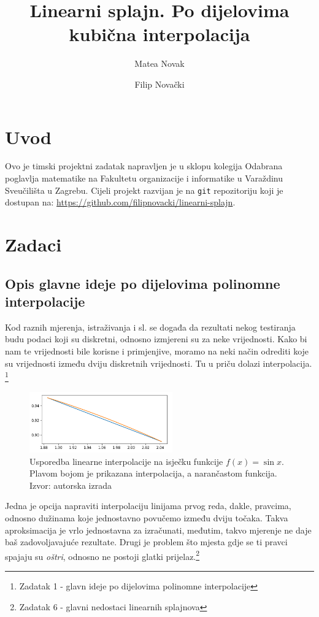 \documentclass[12pt,a4paper]{report}
\author{Matea Novak \and Filip Novački}
\title{Linearni splajn. Po dijelovima kubična interpolacija}
\begin{document}
	\maketitle
	
	\tableofcontents
	
\chapter{Uvod}
	Ovo je timski projektni zadatak napravljen je u sklopu kolegija Odabrana poglavlja matematike na Fakultetu organizacije i informatike u Varaždinu Sveučilišta u Zagrebu. Cijeli projekt razvijan je na \texttt{git} repozitoriju koji je dostupan na: \url{https://github.com/filipnovacki/linearni-splajn}. 
\chapter{Zadaci}
	\section{Opis glavne ideje po dijelovima polinomne interpolacije}
	Kod raznih mjerenja, istraživanja i sl. se događa da rezultati nekog testiranja budu podaci koji su diskretni, odnosno izmjereni su za neke vrijednosti. Kako bi nam te vrijednosti bile korisne i primjenjive, moramo na neki način odrediti koje su vrijednosti između dviju diskretnih vrijednosti. Tu u priču dolazi interpolacija. \footnote{Zadatak 1 - glavn ideje po dijelovima polinomne interpolacije}
	
	\begin{figure}
		\includegraphics[width=0.55\textwidth]{slike/usporedba.png}
		\caption{Usporedba linearne interpolacije na isječku funkcije $f(x)=\sin x$. Plavom bojom je prikazana interpolacija, a narančastom funkcija. Izvor: autorska izrada}
		\label{usporedba}
	\end{figure}
	
	Jedna je opcija napraviti interpolaciju linijama prvog reda, dakle, pravcima, odnosno dužinama koje jednostavno povučemo između dviju točaka. Takva aproksimacija je vrlo jednostavna za izračunati, međutim, takvo mjerenje ne daje baš zadovoljavajuće rezultate\cite{ChEn2450}. Drugi je problem što mjesta gdje se ti pravci spajaju su \textit{oštri}, odnosno ne postoji glatki prijelaz.\footnote{Zadatak 6 - glavni nedostaci linearnih splajnova}
	
\end{document}
